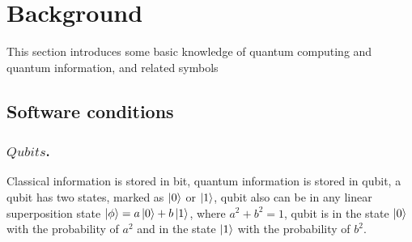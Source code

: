\documentclass[runningheads]{llncs}
\begin{document}
\section{Background}
\label{Background}
This section introduces some basic knowledge of quantum computing and quantum information, and related symbols
\subsection{Software conditions} 
\subsubsection{$Qubits$.}
Classical information is stored in bit, quantum information is stored in qubit, 
a qubit has two states, marked as $\left\vert{0}\right\rangle$ or $\left\vert{1}\right\rangle$, qubit also can be in any linear superposition 
state $\left\vert{\phi}\right\rangle=a\left\vert{0}\right\rangle+b\left\vert{1}\right\rangle$, where $a^{2}+b^{2}=1$, qubit is in the state $\left\vert{0}\right\rangle$ with the probability of $a^{2}$ 
and in the state $\left\vert{1}\right\rangle$ with the probability of $b^{2}$. 
\end{document}
